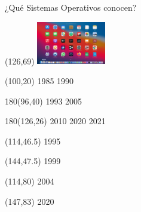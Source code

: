 \documentclass[aspectratio=169]{beamer}
\begin{document}
\begin{frame}{¿Qué Sistemas Operativos conocen?}
    \begin{textblock}{80}(126,69) \includegraphics[width=3cm]{img/macos-10_2020.jpg} \end{textblock}
    \begin{textblock}{80}(100,20) 1985 \hspace{2.3cm} 1990 \end{textblock}
    \begin{textblock}{180}(96,40) 1993 \hspace{0.7cm} 2005 \end{textblock}
    \begin{textblock}{180}(126,26) 2010 \hspace{0.3cm} 2020 \hspace{0.2cm} 2021 \end{textblock}
    \begin{textblock}{80}(114,46.5) 1995 \end{textblock}
    \begin{textblock}{80}(144,47.5) 1999 \end{textblock}
    \begin{textblock}{80}(114,80) 2004 \end{textblock}
    \begin{textblock}{80}(147,83) 2020 \end{textblock}
\end{frame}

\end{document}
